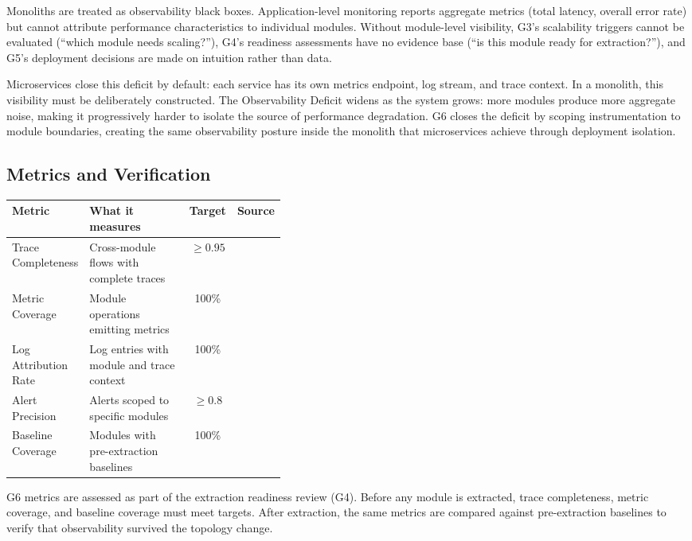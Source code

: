 Monoliths are treated as observability black boxes. Application-level monitoring reports aggregate metrics (total latency, overall error rate) but cannot attribute performance characteristics to individual modules. Without module-level visibility, G3's scalability triggers cannot be evaluated (``which module needs scaling?''), G4's readiness assessments have no evidence base (``is this module ready for extraction?''), and G5's deployment decisions are made on intuition rather than data.

Microservices close this deficit by default: each service has its own metrics endpoint, log stream, and trace context. In a monolith, this visibility must be deliberately constructed. The Observability Deficit widens as the system grows: more modules produce more aggregate noise, making it progressively harder to isolate the source of performance degradation. G6 closes the deficit by scoping instrumentation to module boundaries, creating the same observability posture inside the monolith that microservices achieve through deployment isolation.

\subsection*{Metrics and Verification}

\medskip
\noindent
\small
\begin{tabularx}{\linewidth}{p{0.28\linewidth} X c p{0.12\linewidth}}
\toprule
\textbf{Metric} & \textbf{What it measures} & \textbf{Target} & \textbf{Source} \\
\midrule
Trace Completeness & Cross-module flows with complete traces & $\geq 0.95$ & \cite{FordParsons2017} \\
Metric Coverage & Module operations emitting metrics & 100\% & \cite{martin2012clean} \\
Log Attribution Rate & Log entries with module and trace context & 100\% & \cite{fairbanks2010justenough} \\
Alert Precision & Alerts scoped to specific modules & $\geq 0.8$ & \cite{FordParsons2017} \\
Baseline Coverage & Modules with pre-extraction baselines & 100\% & \cite{wolfart2021modernizing} \\
\bottomrule
\end{tabularx}
\normalsize

\medskip
\noindent
G6 metrics are assessed as part of the extraction readiness review (G4). Before any module is extracted, trace completeness, metric coverage, and baseline coverage must meet targets. After extraction, the same metrics are compared against pre-extraction baselines to verify that observability survived the topology change.

